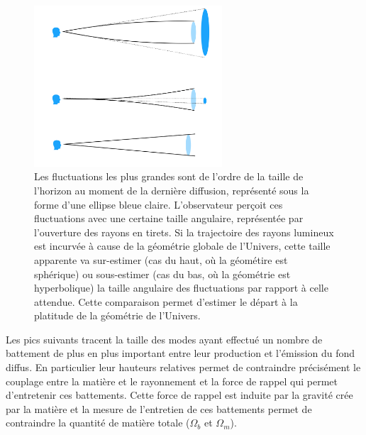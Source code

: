 \begin{figure}[htbp]
	\centering
		\includegraphics[height=6cm]{figs/cmb_geom.png}
		\caption[CMB et géométrie]{Les fluctuations les plus grandes sont de l'ordre de la taille de l'horizon au moment de la dernière diffusion, représenté sous la forme d'une ellipse bleue claire. L'observateur perçoit ces fluctuations avec une certaine taille angulaire, représentée par l'ouverture des rayons en tirets. Si la trajectoire des rayons lumineux est incurvée à cause de la géométrie globale de l'Univers, cette taille apparente va sur-estimer (cas du haut, où la géométire est sphérique) ou sous-estimer (cas du bas, où la géométrie est hyperbolique) la taille angulaire des fluctuations par rapport à celle attendue. Cette comparaison permet d'estimer le départ à la platitude de la géométrie de l'Univers.  }
	\label{f:cmb_geom}
\end{figure}


Les pics suivants tracent la taille des modes ayant effectué un nombre de battement de plus en plus important entre leur production et l'émission du fond diffus. En particulier leur hauteurs relatives permet de contraindre précisément le couplage entre la matière et le rayonnement et la force de rappel qui permet d'entretenir ces battements. Cette force de rappel est induite par la gravité crée par la matière et la mesure de l'entretien de ces battements permet de contraindre la quantité de matière totale ($\Omega_b$ et $\Omega_m$). 



